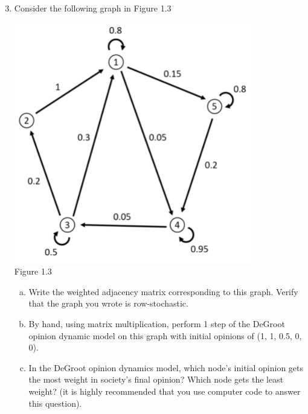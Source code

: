\documentclass[11pt]{article}
\begin{document}
\begin{enumerate}
	\setcounter{enumi}{2}
	\item Consider the following graph in Figure 1.3
	\begin{center}
		\includegraphics[scale=0.6]{Question3_Figure1.3}\\
		Figure 1.3
	\end{center}
	\begin{enumerate}[(a)]
		\item Write the weighted adjacency matrix corresponding to this graph. Verify that the graph you wrote is row-stochastic.
		\item By hand, using matrix multiplication, perform 1 step of the DeGroot opinion dynamic model on this graph with initial opinions of (1, 1, 0.5, 0, 0).
		\item In the DeGroot opinion dynamics model, which node's initial opinion gets the most weight in society's final opinion? Which node gets the least weight? (it is highly recommended that you use computer code to answer this question).
	\end{enumerate}	
\end{enumerate}
\end{document}
